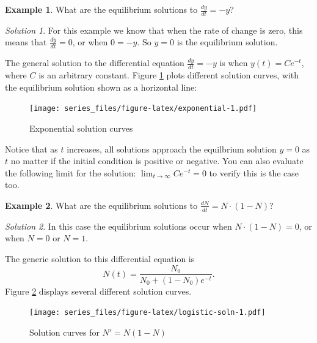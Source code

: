 \documentclass[
]{book}
\theoremstyle{definition}
\theoremstyle{definition}
\newtheorem{example}{Example}[chapter]
\theoremstyle{definition}
\theoremstyle{remark}
\newtheorem*{solution}{Solution}
\begin{document}
\begin{example}
\protect\hypertarget{exm:unnamed-chunk-78}{}{\label{exm:unnamed-chunk-78} }What are the equilibrium solutions to \(\displaystyle \frac{dy}{dt}=- y\)?
\end{example}

\begin{solution}
{}For this example we know that when the rate of change is zero, this means that \(\displaystyle \frac{dy}{dt} = 0\), or when \(0 = -y\). So \(y=0\) is the equilibrium solution.
\end{solution}

The general solution to the differential equation \(\displaystyle \frac{dy}{dt}=- y\) is when \(y(t)=Ce^{-t}\), where \(C\) is an arbitrary constant. Figure \ref{fig:exponential} plots different solution curves, with the equilibrium solution shown as a horizontal line:

\begin{figure}
\centering
\texttt{[image: series\_files/figure-latex/exponential-1.pdf]}
\caption{\label{fig:exponential}Exponential solution curves}
\end{figure}

Notice that as \(t\) increases, all solutions approach the equilbrium solution \(y=0\) as \(t\) no matter if the initial condition is positive or negative. You can also evaluate the following limit for the solution: \(\displaystyle \lim_{t\rightarrow \infty} Ce^{-t} = 0\) to verify this is the case too.

\begin{example}
\protect\hypertarget{exm:unnamed-chunk-80}{}{\label{exm:unnamed-chunk-80} }What are the equilibrium solutions to \(\displaystyle \frac{dN}{dt} = N \cdot(1-N)\)?
\end{example}

\begin{solution}
{}In this case the equilibrium solutions occur when \(N \cdot(1-N) = 0\), or when \(N=0\) or \(N=1\).
\end{solution}

The generic solution to this differential equation is \[ \displaystyle N(t)= \frac{N_0}{N_0 +(1-N_0) e^{-t}}.\] Figure \ref{fig:logistic-soln} displays several different solution curves.

\begin{figure}
\centering
\texttt{[image: series\_files/figure-latex/logistic-soln-1.pdf]}
\caption{\label{fig:logistic-soln}Solution curves for \(N'=N(1-N)\)}
\end{figure}
\end{document}
